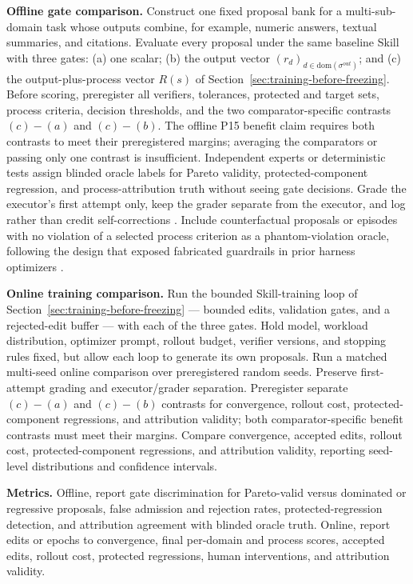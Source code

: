 \textbf{Offline gate comparison.} Construct one fixed proposal bank for a multi-sub-domain task whose outputs combine, for example, numeric answers, textual summaries, and citations. Evaluate every proposal under the same baseline Skill with three gates: (a) one scalar; (b) the output vector $\left(r_d\right)_{d\in\mathrm{dom}(\sigma^{out})}$; and (c) the output-plus-process vector $R(s)$ of Section~\ref{sec:training-before-freezing}. Before scoring, preregister all verifiers, tolerances, protected and target sets, process criteria, decision thresholds, and the two comparator-specific contrasts $(c)-(a)$ and $(c)-(b)$. The offline P15 benefit claim requires both contrasts to meet their preregistered margins; averaging the comparators or passing only one contrast is insufficient. Independent experts or deterministic tests assign blinded oracle labels for Pareto validity, protected-component regression, and process-attribution truth without seeing gate decisions. Grade the executor's first attempt only, keep the grader separate from the executor, and log rather than credit self-corrections \cite{anand2026aeval}. Include counterfactual proposals or episodes with no violation of a selected process criterion as a phantom-violation oracle, following the design that exposed fabricated guardrails in prior harness optimizers \cite{wang2026phantom}.

\textbf{Online training comparison.} Run the bounded Skill-training loop of Section~\ref{sec:training-before-freezing} --- bounded edits, validation gates, and a rejected-edit buffer --- with each of the three gates. Hold model, workload distribution, optimizer prompt, rollout budget, verifier versions, and stopping rules fixed, but allow each loop to generate its own proposals. Run a matched multi-seed online comparison over preregistered random seeds. Preserve first-attempt grading and executor/grader separation. Preregister separate $(c)-(a)$ and $(c)-(b)$ contrasts for convergence, rollout cost, protected-component regressions, and attribution validity; both comparator-specific benefit contrasts must meet their margins. Compare convergence, accepted edits, rollout cost, protected-component regressions, and attribution validity, reporting seed-level distributions and confidence intervals.

\textbf{Metrics.} Offline, report gate discrimination for Pareto-valid versus dominated or regressive proposals, false admission and rejection rates, protected-regression detection, and attribution agreement with blinded oracle truth. Online, report edits or epochs to convergence, final per-domain and process scores, accepted edits, rollout cost, protected regressions, human interventions, and attribution validity.

